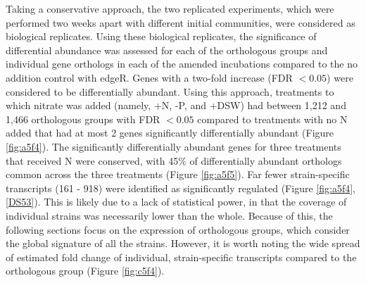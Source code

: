 Taking a conservative approach, the two replicated experiments, which were performed two weeks apart with different initial communities, were considered as biological replicates. Using these biological replicates, the significance of differential abundance was assessed for each of the orthologous groups and individual gene orthologs in each of the amended incubations compared to the no addition control with edgeR. Genes with a two-fold increase (FDR $< 0.05$) were considered to be differentially abundant. Using this approach, treatments to which nitrate was added (namely, +N, -P, and +DSW) had between 1,212 and 1,466 orthologous groups with FDR $< 0.05$ compared to treatments with no N added that had at most 2 genes significantly differentially abundant (Figure \ref{fig:a5f4}). The significantly differentially abundant genes for three treatments that received N were conserved, with 45\% of differentially abundant orthologs common across the three treatments (Figure \ref{fig:a5f5}). Far fewer strain-specific transcripts (161 - 918) were identified as significantly regulated (Figure \ref{fig:a5f4}, \ref{DS53}). This is likely due to a lack of statistical power, in that the coverage of individual strains was necessarily lower than the whole. Because of this, the following sections focus on the expression of orthologous groups, which consider the global signature of all the strains. However, it is worth noting the wide spread of estimated fold change of individual, strain-specific transcripts compared to the orthologous group (Figure \ref{fig:c5f4}). \par

